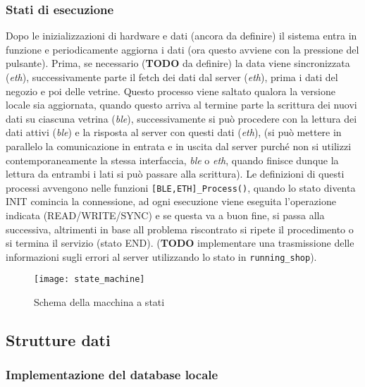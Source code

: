 \subsubsection{Stati di esecuzione}


Dopo le inizializzazioni di hardware e dati (ancora da definire) il sistema entra in funzione e periodicamente aggiorna i dati (ora questo avviene con la pressione del pulsante). Prima, se necessario (\textbf{TODO} da definire) la data viene sincronizzata (\textit{eth}), successivamente parte il fetch dei dati dal server (\textit{eth}), prima i dati del negozio e poi delle vetrine. Questo processo viene saltato qualora la versione locale sia aggiornata, quando questo arriva al termine parte la scrittura dei nuovi dati su ciascuna vetrina (\textit{ble}), successivamente si pu\`o procedere con la lettura dei dati attivi (\textit{ble}) e la risposta al server con questi dati (\textit{eth}), (si pu\`o mettere in parallelo la comunicazione in entrata e in uscita dal server purch\'e non si utilizzi contemporaneamente la stessa interfaccia, \textit{ble} o \textit{eth}, quando finisce dunque la lettura da entrambi i lati si pu\`o passare alla scrittura). Le definizioni di questi processi avvengono nelle funzioni \texttt{[BLE,ETH]\_Process()}, quando lo stato diventa INIT comincia la connessione, ad ogni esecuzione viene eseguita l'operazione indicata (READ/WRITE/SYNC) e se questa va a buon fine, si passa alla successiva, altrimenti in base all problema riscontrato si ripete il procedimento o si termina il servizio (stato END). (\textbf{TODO} implementare una trasmissione delle informazioni sugli errori al server utilizzando lo stato in \texttt{running\_shop}). 

\begin{figure}[ht]
	\texttt{[image: state\_machine]}
  \caption{Schema della macchina a stati}
\end{figure}

\subsection{Strutture dati}

\subsubsection{Implementazione del database locale}


